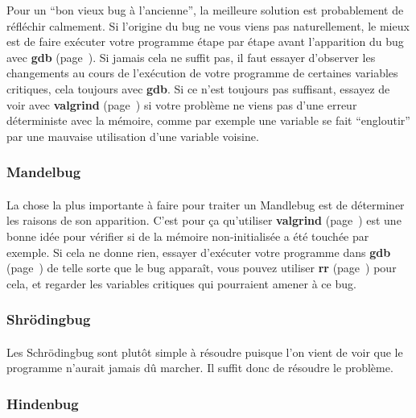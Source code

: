 Pour un ``bon vieux bug à l'ancienne'', la meilleure solution est probablement
de réfléchir calmement. Si l'origine du bug ne vous viens pas naturellement, le
mieux est de faire exécuter votre programme étape par étape avant l'apparition
du bug avec \textbf{gdb} (page~\pageref{part:gdb}). Si jamais cela ne suffit
pas, il faut essayer d'observer les changements au cours de l'exécution de
votre programme de certaines variables critiques, cela toujours avec
\textbf{gdb}. Si ce n'est toujours pas suffisant, essayez de voir avec
\textbf{valgrind} (page~\pageref{part:valgrind}) si votre problème ne viens pas
d'une erreur déterministe avec la mémoire, comme par exemple une variable se
fait ``engloutir'' par une mauvaise utilisation d'une variable voisine.

\subsubsection{Mandelbug}

\paragraph{}

La chose la plus importante à faire pour traiter un Mandlebug est de déterminer
les raisons de son apparition. C'est pour ça qu'utiliser \textbf{valgrind}
(page~\pageref{part:valgrind}) est une bonne idée pour vérifier si de la
mémoire non-initialisée a été touchée par exemple. Si cela ne donne rien,
essayer d'exécuter votre programme dans \textbf{gdb} (page~\pageref{part:gdb})
de telle sorte que le bug apparaît, vous pouvez utiliser \textbf{rr}
(page~\pageref{part:rr}) pour cela, et regarder les variables critiques qui
pourraient amener à ce bug.


\subsubsection{Shrödingbug}

\paragraph{}

Les Schrödingbug sont plutôt simple à résoudre puisque l'on vient de voir que
le programme n'aurait jamais dû marcher. Il suffit donc de résoudre le
problème.

\subsubsection{Hindenbug}

